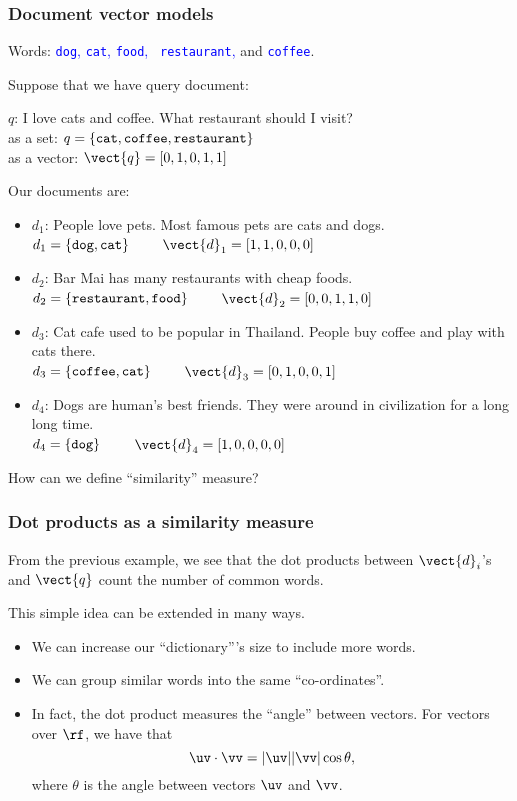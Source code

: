 \begin{frame}
  \frametitle{Document vector models}
  
  Words: \textcolor{blue}{{\tt dog}, {\tt cat}, {\tt food}, {\tt
      restaurant},} and \textcolor{blue}{\tt coffee}.

  Suppose that we have query document:

  $q$: {\tiny I love cats and coffee.  What restaurant should I
    visit?} \\
  \pause as a set:
  $q=\{\mbox{\tt cat}, \mbox{\tt coffee}, \mbox{\tt restaurant}\}$ \\
  \pause as a vector:
  $\vect{q}=[0,1,0,1,1]$

  \pause
  \vspace{0.2in}
  {\small
  Our documents are:
  \begin{itemize}
  \item $d_1$: {\tiny People love pets.  Most famous pets are cats and
    dogs.} \\
    $d_1=\{\mbox{\tt dog}, \mbox{\tt cat}\}$ \ \ \ \ $\vect{d}_1=[1,1,0,0,0]$
  \item $d_2$: {\tiny Bar Mai has many restaurants with cheap foods.} \\
    $d_2=\{\mbox{\tt restaurant}, \mbox{\tt food}\}$ \ \ \ \ $\vect{d}_2=[0,0,1,1,0]$
  \item $d_3$: {\tiny Cat cafe used to be popular in Thailand.  People
    buy coffee and play with cats there.} \\
    $d_3=\{\mbox{\tt coffee}, \mbox{\tt cat}\}$ \ \ \ \ $\vect{d}_3=[0,1,0,0,1]$
  \item $d_4$: {\tiny Dogs are human's best friends.  They were around
    in civilization for a long long time.} \\
    $d_4=\{\mbox{\tt dog}\}$ \ \ \ \ $\vect{d}_4=[1,0,0,0,0]$
  \end{itemize}
  }
  
  \pause
  How can we define ``similarity'' measure?
\end{frame}

\begin{frame}
  \frametitle{Dot products as a similarity measure}

  From the previous example, we see that the dot products between
  $\vect{d}_i$'s and $\vect{q}$ count the number of common words.

  \pause
  \vspace{0.1in}
  This simple idea can be extended in many ways.

  \pause
  \begin{itemize}
  \item We can increase our ``dictionary'''s size to include more
    words.
    \pause
  \item We can group similar words into the same ``co-ordinates''.
    \pause
  \item In fact, the dot product measures the ``angle'' between
    vectors.  For vectors over $\rf$, we have that
    \[
    \uv\cdot\vv = |\uv||\vv|\cos\theta,
    \]
    where $\theta$ is the angle between vectors $\uv$ and $\vv$.
  \end{itemize}
\end{frame}

